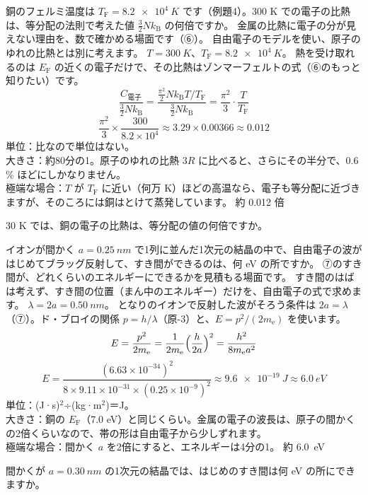 \label{ph:原-8:ex6}
\begin{phreidai}
銅のフェルミ温度は $T_{\mathrm F}=\qty{8.2e4}{K}$ です（例題4）。300 K での電子の比熱は、等分配の法則で考えた値 $\tfrac32Nk_{\mathrm B}$ の何倍ですか。
\phbamen
金属の比熱に電子の分が見えない理由を、数で確かめる場面です（⑥）。
\phmushi
自由電子のモデルを使い、原子のゆれの比熱とは別に考えます。
\phzu
$T=\qty{300}{K}$、$T_{\mathrm F}=\qty{8.2e4}{K}$。
\phriyu
熱を受け取れるのは $E_{\mathrm F}$ の近くの電子だけで、その比熱はゾンマーフェルトの式（⑥のもっと知りたい）です。
\phtateru
\[ \frac{C_{\text{電子}}}{\tfrac32Nk_{\mathrm B}}=\frac{\tfrac{\pi^2}{2}Nk_{\mathrm B}T/T_{\mathrm F}}{\tfrac32Nk_{\mathrm B}}=\frac{\pi^2}{3}\cdot\frac{T}{T_{\mathrm F}} \]
\phtoku
\[ \frac{\pi^2}{3}\times\frac{300}{8.2\times10^4}\approx3.29\times0.00366\approx0.012 \]
\phtashikame
単位：比なので単位はない。\\
大きさ：約80分の1。原子のゆれの比熱 $3R$ に比べると、さらにその半分で、0.6\,\% ほどにしかなりません。\\
極端な場合：$T$ が $T_{\mathrm F}$ に近い（何万 K）ほどの高温なら、電子も等分配に近づきますが、そのころには銅はとけて蒸発しています。
\kotae 約 0.012 倍
\end{phreidai}
\begin{jibun}
30 K では、銅の電子の比熱は、等分配の値の何倍ですか。
\end{jibun}

\label{ph:原-8:ex7}
\begin{phreidai}
イオンが間かく $a=\qty{0.25}{nm}$ で1列に並んだ1次元の結晶の中で、自由電子の波がはじめてブラッグ反射して、すき間ができるのは、何 eV の所ですか。
\phbamen
⑦のすき間が、どれくらいのエネルギーにできるかを見積もる場面です。
\phmushi
すき間のはばは考えず、すき間の位置（まん中のエネルギー）だけを、自由電子の式で求めます。
\phzu
$\lambda=2a=\qty{0.50}{nm}$。
\phriyu
となりのイオンで反射した波がそろう条件は $2a=\lambda$（⑦）。ド・ブロイの関係 $p=h/\lambda$（原-3）と、$E=p^2/(2m_{\mathrm e})$ を使います。
\phtateru
\[ E=\frac{p^2}{2m_{\mathrm e}}=\frac{1}{2m_{\mathrm e}}\Bigl(\frac{h}{2a}\Bigr)^2=\frac{h^2}{8m_{\mathrm e}a^2} \]
\phtoku
\[ E=\frac{(6.63\times10^{-34})^2}{8\times9.11\times10^{-31}\times(0.25\times10^{-9})^2}\approx\qty{9.6e-19}{J}\approx\qty{6.0}{eV} \]
\phtashikame
単位：(J·s)$^2$÷(kg·m$^2$)＝J。\\
大きさ：銅の $E_{\mathrm F}$（7.0 eV）と同じくらい。金属の電子の波長は、原子の間かくの2倍くらいなので、帯の形は自由電子から少しずれます。\\
極端な場合：間かく $a$ を2倍にすると、エネルギーは4分の1。
\kotae 約 \qty{6.0}{eV}
\end{phreidai}
\begin{jibun}
間かくが $a=\qty{0.30}{nm}$ の1次元の結晶では、はじめのすき間は何 eV の所にできますか。
\end{jibun}

